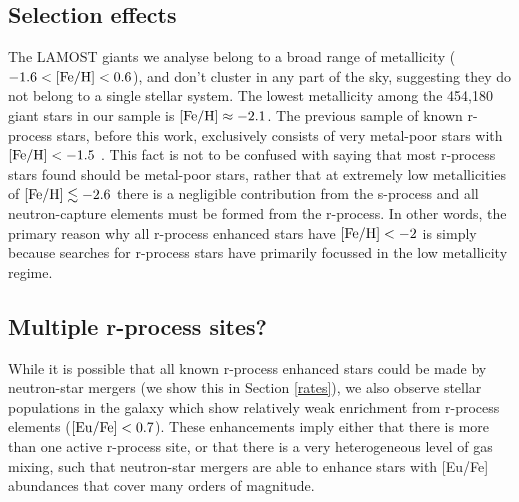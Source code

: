 \documentclass[a4paper,fleqn,usenatbib]{mnras}
\begin{document}
	\subsection{Selection effects}
	The LAMOST giants we analyse belong to a broad range of metallicity ($-1.6 < \rm{[Fe/H]} < 0.6$), and don't cluster in any part of the sky, suggesting they do not belong to a single stellar system. The lowest metallicity among the 454,180 giant stars in our sample is $[{\rm Fe/H}] \approx -2.1$. The previous sample of known r-process stars, before this work, exclusively consists of very metal-poor stars with $[{\rm Fe/H}] < -1.5$ \citep{Barklem2005}. This fact is not to be confused with saying that most r-process stars found should be metal-poor stars, rather that at extremely low metallicities of $[{\rm Fe/H}] \lesssim -2.6$ \citep{Simmerer2004} there is a negligible contribution from the s-process
	and all neutron-capture elements must be formed from the r-process. In other words, the primary reason why all r-process enhanced stars have $[{\rm Fe/H}] < -2$ is simply because searches for r-process stars have primarily focussed in the low metallicity regime.
	
	
	
	\subsection{Multiple r-process sites?}
	While it is possible that all known r-process enhanced stars could be made by neutron-star mergers (we show this in Section \ref{rates}), we also observe stellar populations in the galaxy which show relatively weak enrichment from r-process elements ($[{\rm Eu/Fe}] < 0.7$). These enhancements imply either that there is more than one active r-process site, or that there is a very heterogeneous level of gas mixing, such that neutron-star mergers are able to enhance stars with [Eu/Fe] abundances that cover  many orders of magnitude.
	
\end{document}
